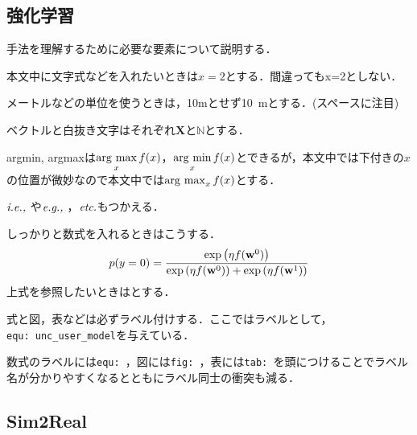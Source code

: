 \subsection{強化学習}
手法を理解するために必要な要素について説明する．

\vspace{10truemm}

本文中に文字式などを入れたいときは$x=2$とする．間違ってもx=2としない．

メートルなどの単位を使うときは，10mとせず\SI{10}{m}とする．(スペースに注目)

ベクトルと白抜き文字はそれぞれ$\mathbf{X}$と$\mathbb{N}$とする．

argmin, argmaxは$\mathop{\rm arg~max}\limits_x f(x)$，$\mathop{\rm arg~min}\limits_x f(x)$とできるが，本文中では下付きの$x$の位置が微妙なので本文中では$\operatorname*{\rm arg~max}_x f(x)$とする．

$\textit{i.e.,}~$や$\textit{e.g.,}~$，$\textit{etc.}$もつかえる．

しっかりと数式を入れるときはこうする．
\begin{equation}
    p(y=0) = \frac{\exp \left(\eta f({\bf w}^0)\right)}{\exp \left(\eta f({\bf w}^0)\right) + \exp \left(\eta f({\bf w}^1)\right)} 
    \label{equ: unc_user_model}
\end{equation}
上式を参照したいときはとする．

式と図，表などは必ずラベル付けする．ここではラベルとして，\texttt{equ:~unc\_user\_model}を与えている．

数式のラベルには\texttt{equ:~}，図には\texttt{fig:~}，表には\texttt{tab:~}を頭につけることでラベル名が分かりやすくなるとともにラベル同士の衝突も減る．

\subsection{Sim2Real}